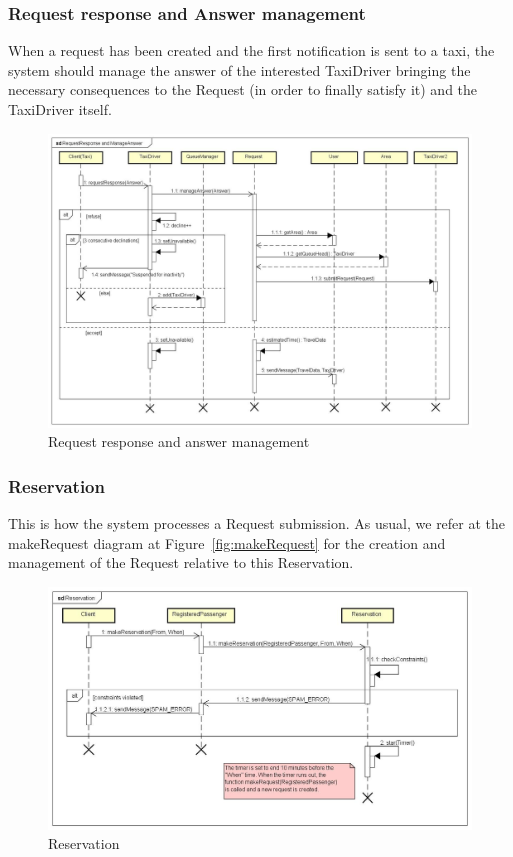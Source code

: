 		\subsubsection{Request response and Answer management}
		When a request has been created and the first notification is sent to a taxi, the system should
		manage the answer of the interested TaxiDriver bringing the necessary consequences to the Request
		(in order to finally satisfy it) and the TaxiDriver itself.
		\begin{figure}[h!]
			\begin{center}
				\includegraphics[width=1\linewidth]{../SE2_SD/RequestResponseManageAnswer}
				\caption{Request response and answer management}
			\end{center}
		\end{figure}
		\clearpage
		\subsubsection{Reservation}
		This is how the system processes a Request submission. As usual, we refer at the makeRequest
		diagram at Figure~\ref{fig:makeRequest} for the creation and management of the Request relative
		to this Reservation.
		\begin{figure}[h!]
			\begin{center}
				\includegraphics[width=1\linewidth]{../SE2_SD/Reservation}
				\caption{Reservation}
			\end{center}
		\end{figure}
		\clearpage

